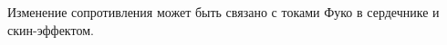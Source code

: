 Изменение сопротивления может быть связано с токами Фуко в сердечнике и скин-эффектом.

\begin{figure}[ht!]
\end{figure}

